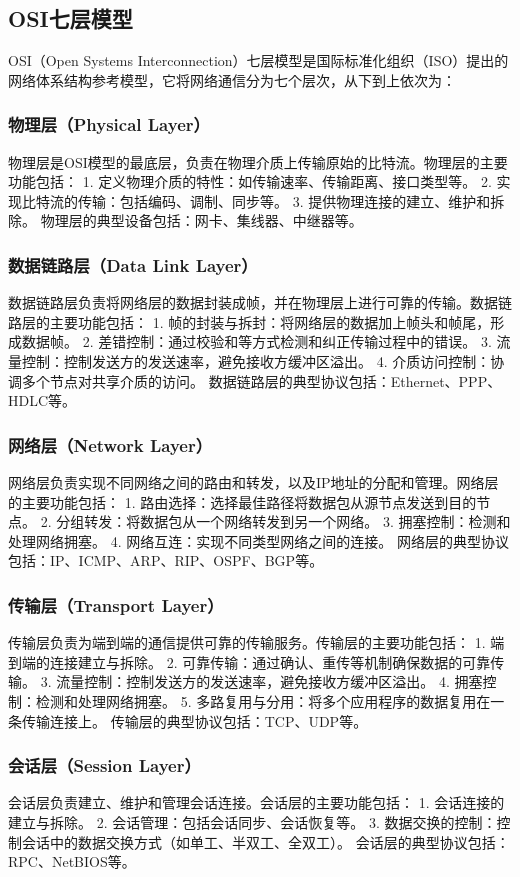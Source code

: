 \documentclass{book}
\begin{document}
\subsection{OSI七层模型}
OSI（Open Systems Interconnection）七层模型是国际标准化组织（ISO）提出的网络体系结构参考模型，它将网络通信分为七个层次，从下到上依次为：
\subsubsection{物理层（Physical Layer）}
物理层是OSI模型的最底层，负责在物理介质上传输原始的比特流。物理层的主要功能包括：
1. 定义物理介质的特性：如传输速率、传输距离、接口类型等。
2. 实现比特流的传输：包括编码、调制、同步等。
3. 提供物理连接的建立、维护和拆除。
物理层的典型设备包括：网卡、集线器、中继器等。
\subsubsection{数据链路层（Data Link Layer）}
数据链路层负责将网络层的数据封装成帧，并在物理层上进行可靠的传输。数据链路层的主要功能包括：
1. 帧的封装与拆封：将网络层的数据加上帧头和帧尾，形成数据帧。
2. 差错控制：通过校验和等方式检测和纠正传输过程中的错误。
3. 流量控制：控制发送方的发送速率，避免接收方缓冲区溢出。
4. 介质访问控制：协调多个节点对共享介质的访问。
数据链路层的典型协议包括：Ethernet、PPP、HDLC等。
\subsubsection{网络层（Network Layer）}
网络层负责实现不同网络之间的路由和转发，以及IP地址的分配和管理。网络层的主要功能包括：
1. 路由选择：选择最佳路径将数据包从源节点发送到目的节点。
2. 分组转发：将数据包从一个网络转发到另一个网络。
3. 拥塞控制：检测和处理网络拥塞。
4. 网络互连：实现不同类型网络之间的连接。
网络层的典型协议包括：IP、ICMP、ARP、RIP、OSPF、BGP等。
\subsubsection{传输层（Transport Layer）}
传输层负责为端到端的通信提供可靠的传输服务。传输层的主要功能包括：
1. 端到端的连接建立与拆除。
2. 可靠传输：通过确认、重传等机制确保数据的可靠传输。
3. 流量控制：控制发送方的发送速率，避免接收方缓冲区溢出。
4. 拥塞控制：检测和处理网络拥塞。
5. 多路复用与分用：将多个应用程序的数据复用在一条传输连接上。
传输层的典型协议包括：TCP、UDP等。
\subsubsection{会话层（Session Layer）}
会话层负责建立、维护和管理会话连接。会话层的主要功能包括：
1. 会话连接的建立与拆除。
2. 会话管理：包括会话同步、会话恢复等。
3. 数据交换的控制：控制会话中的数据交换方式（如单工、半双工、全双工）。
会话层的典型协议包括：RPC、NetBIOS等。
\end{document}
